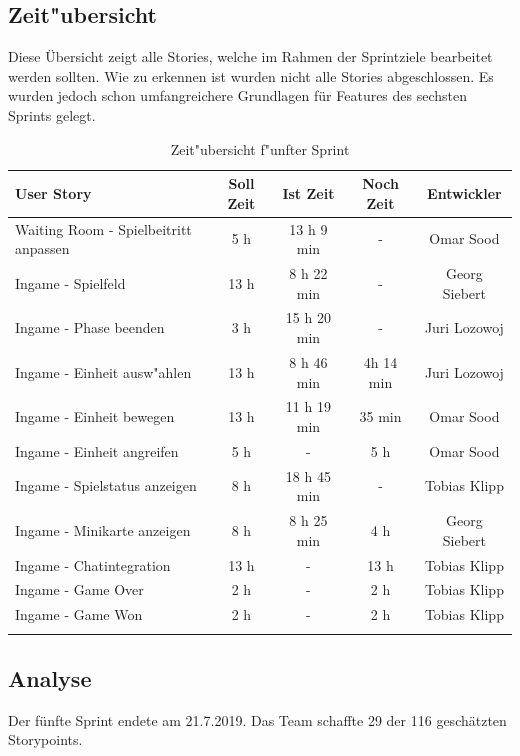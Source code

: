 \documentclass[12pt, titlepage]{scrartcl}
\begin{document}
        \subsection{Zeit"ubersicht}
        	Diese \"Ubersicht zeigt alle Stories, welche im Rahmen der Sprintziele bearbeitet werden sollten. Wie zu erkennen ist wurden nicht alle Stories abgeschlossen. Es wurden jedoch schon umfangreichere Grundlagen f\"ur Features des sechsten Sprints gelegt.
        	\begin{longtable}[H]{p{6cm} c c c c }
        			\label{Time_1}
       				\textbf{User Story} & \textbf{Soll Zeit} & \textbf{Ist Zeit} & \textbf{Noch Zeit} & \textbf{Entwickler} \\
       				\toprule
       				\endhead
       				Waiting Room - Spielbeitritt anpassen & 5 h & 13 h 9 min & - & Omar Sood\\
       				Ingame - Spielfeld & 13 h & 8 h 22 min & - & Georg Siebert\\
       				Ingame - Phase beenden & 3 h & 15 h 20 min & - & Juri Lozowoj \\
       				Ingame - Einheit ausw"ahlen & 13 h & 8 h 46 min & 4h 14 min & Juri Lozowoj \\
       				Ingame - Einheit bewegen & 13 h & 11 h 19 min & 35 min & Omar Sood \\
       				Ingame - Einheit angreifen & 5 h & - & 5 h & Omar Sood \\
       				Ingame - Spielstatus anzeigen & 8 h & 18 h 45 min & - & Tobias Klipp \\
       				Ingame - Minikarte anzeigen & 8 h & 8 h 25 min & 4 h & Georg Siebert \\
       				Ingame - Chatintegration & 13 h & - & 13 h & Tobias Klipp \\
       				Ingame - Game Over & 2 h & - & 2 h & Tobias Klipp \\
       				Ingame - Game Won & 2 h & - & 2 h & Tobias Klipp \\
        			\caption{Zeit"ubersicht f"unfter Sprint}
        	\end{longtable}
        \subsection{Analyse}
        	Der f\"unfte Sprint endete am 21.7.2019. Das Team schaffte 29 der 116 gesch\"atzten Storypoints.
\end{document}
